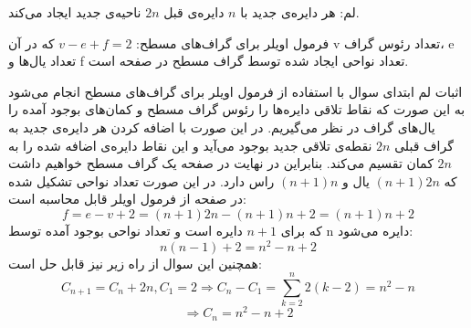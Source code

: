\p
    لم: هر دایره‌ی جدید با 
    $n$ 
    دایره‌ی قبل
    $2n$ 
    ناحیه‌ی جدید ایجاد می‌کند.
    

    فرمول اویلر برای گراف‌های مسطح: \( v-e+f=2 \) که در آن v تعداد رئوس گراف، e تعداد یال‌ها و f تعداد نواحی ایجاد شده توسط گراف مسطح در صفحه است. 
    

     اثبات لم ابتدای سوال با استفاده از فرمول اویلر برای گراف‌های مسطح انجام می‌شود به این صورت که نقاط تلاقی دایره‌ها را رئوس گراف مسطح و کمان‌های بوجود آمده را یال‌های گراف در نظر می‌گیریم. در این صورت با اضافه کردن هر دایره‌ی جدید به گراف قبلی 
     $2n$
      نقطه‌ی تلاقی جدید بوجود می‌آید و این نقاط دایره‌ی اضافه شده را به
     $2n$
      کمان تقسیم می‌کند. بنابراین در نهایت در صفحه یک گراف مسطح خواهیم داشت که $(n+1)2n$ یال و $(n+1)n$ راس دارد. در این صورت تعداد نواحی تشکیل شده در صفحه از فرمول اویلر قابل محاسبه است:
    \[ f = e - v + 2 = (n+1)2n - (n+1)n + 2 = (n+1)n + 2 \]که برای \(n+1\) دایره است و تعداد نواحی بوجود آمده توسط n دایره می‌شود:
    \[n(n-1)+2 = n^2 - n + 2\]
    همچنین این سوال از راه زیر نیز قابل حل است:
    $$ C_{n+1} = C_n + 2n , C_1 = 2 \Rightarrow C_n - C_1 = \sum\limits_{k=2}^{n} 2(k-2) = n^2-n$$
    $$\Rightarrow C_n = n^2-n+2 $$
